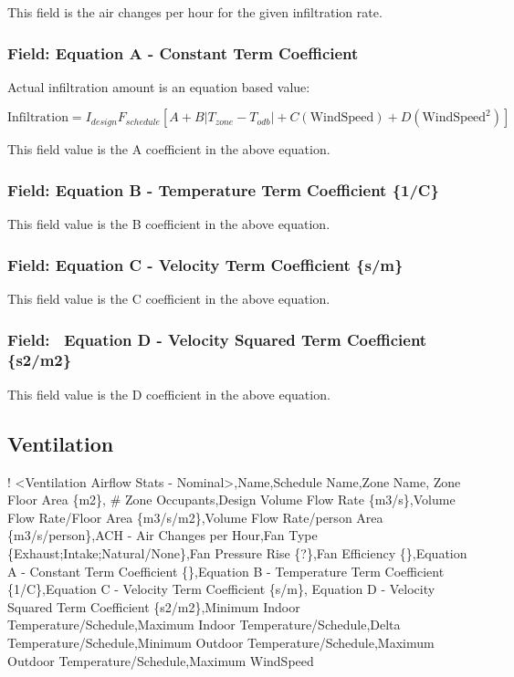 This field is the air changes per hour for the given infiltration rate.

\subsubsection{Field: Equation A - Constant Term Coefficient}\label{field-equation-a---constant-term-coefficient}

Actual infiltration amount is an equation based value:

\begin{equation}
\text{Infiltration} = I_{design} F_{schedule} \left[ A + B \left| T_{zone}-T_{odb} \right| + C\left(\text{WindSpeed}\right) + D\left(\text{WindSpeed}^2\right)  \right]
\end{equation}

This field value is the A coefficient in the above equation.

\subsubsection{Field: Equation B - Temperature Term Coefficient \{1/C\}}\label{field-equation-b---temperature-term-coefficient-1c}

This field value is the B coefficient in the above equation.

\subsubsection{Field: Equation C - Velocity Term Coefficient \{s/m\}}\label{field-equation-c---velocity-term-coefficient-sm}

This field value is the C coefficient in the above equation.

\subsubsection{Field:~ Equation D - Velocity Squared Term Coefficient \{s2/m2\}}\label{field-equation-d---velocity-squared-term-coefficient-s2m2}

This field value is the D coefficient in the above equation.

\subsection{Ventilation}\label{ventilation}

! \textless{}Ventilation Airflow Stats - Nominal\textgreater{},Name,Schedule Name,Zone Name, Zone Floor Area \{m2\}, \# Zone Occupants,Design Volume Flow Rate \{m3/s\},Volume Flow Rate/Floor Area \{m3/s/m2\},Volume Flow Rate/person Area \{m3/s/person\},ACH - Air Changes per Hour,Fan Type \{Exhaust;Intake;Natural/None\},Fan Pressure Rise \{?\},Fan Efficiency \{\},Equation A - Constant Term Coefficient \{\},Equation B - Temperature Term Coefficient \{1/C\},Equation C - Velocity Term Coefficient \{s/m\}, Equation D - Velocity Squared Term Coefficient \{s2/m2\},Minimum Indoor Temperature/Schedule,Maximum Indoor Temperature/Schedule,Delta Temperature/Schedule,Minimum Outdoor Temperature/Schedule,Maximum Outdoor Temperature/Schedule,Maximum WindSpeed

